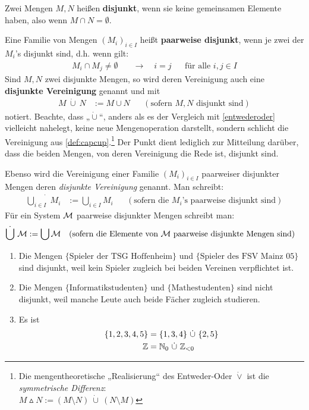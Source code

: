 \begin{defin}[Disjunktheit] \label{def:disjunkt} 
    Zwei Mengen $M,N$ heißen \textbf{disjunkt}, wenn sie keine gemeinsamen Elemente haben, also wenn $M\cap N=\emptyset$.

    Eine Familie von Mengen $(M_i)_{i\in I}$ heißt \textbf{paarweise disjunkt}, wenn je zwei der $M_i$'s disjunkt sind, d.h. wenn gilt:
    \begin{align*}
        M_i\cap M_j \neq  \emptyset \quad& \to\quad i=j &&\text{für alle $i,j\in I$}
    \end{align*}
    Sind $M,N$ zwei disjunkte Mengen, so wird deren Vereinigung auch eine \textbf{disjunkte Vereinigung} genannt und mit
    \begin{align*}
        M\ \dot\cup\ N & := M\cup N && (\text{sofern $M,N$ disjunkt sind})
    \end{align*}
    notiert. Beachte, dass „$\dot\cup$“, anders als es der Vergleich mit \cref{entwederoder} vielleicht nahelegt, keine neue Mengenoperation darstellt, sondern schlicht die Vereinigung aus \cref{def:capcup}.\footnote{Die mengentheoretische „Realisierung“ des Entweder-Oder $\dot\lor$ ist die \emph{symmetrische Differenz}: \\
    $M\vartriangle N:= (M\setminus N)\ \dot\cup\ (N\setminus M)$} Der Punkt dient lediglich zur Mitteilung darüber, dass die beiden Mengen, von deren Vereinigung die Rede ist, disjunkt sind.

    Ebenso wird die Vereinigung einer Familie $(M_i)_{i\in I}$ paarweiser disjunkter Mengen deren \emph{disjunkte Vereinigung} genannt. Man schreibt:
    \begin{align*}
        \dot{\bigcup_{i\in I}}\ M_i & := \bigcup_{i\in I} M_i && (\text{sofern die $M_i$'s paarweise disjunkt sind})
    \end{align*}
    Für ein System $\mathcal M$ paarweise disjunkter Mengen schreibt man:
    \begin{align*}
        \dot{\bigcup}\ \mathcal M & := \bigcup \mathcal M && (\text{sofern die Elemente von $\mathcal M$ paarweise disjunkte Mengen sind})
    \end{align*}
\end{defin}


\begin{bsp} \label{bsp:disjunkt} \quad
    \begin{enumerate}
        \item Die Mengen $\{\text{Spieler der TSG Hoffenheim}\}$ und $\{\text{Spieler des FSV Mainz 05}\}$ sind disjunkt, weil kein Spieler zugleich bei beiden Vereinen verpflichtet ist.
        \item Die Mengen $\{\text{Informatikstudenten}\}$ und $\{\text{Mathestudenten}\}$ sind nicht disjunkt, weil manche Leute auch beide Fächer zugleich studieren.
        \item Es ist
        \begin{align*}
        \{1,2,3,4,5\} & = \{1,3,4\}\ \dot\cup\ \{2,5\} \\
        \mathbb Z & = \mathbb N_0\ \dot\cup\ \mathbb Z_{<0}
        \end{align*}
    \end{enumerate}
\end{bsp}


